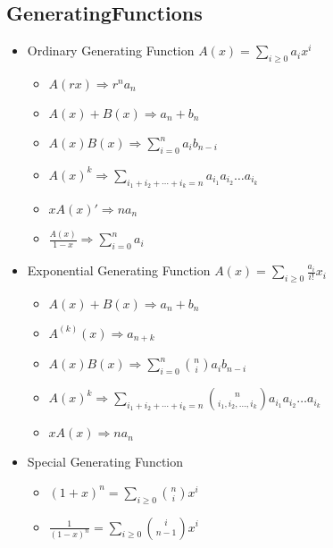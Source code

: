 \documentclass[10pt, a4paper, twocolumn, oneside]{article}
\begin{document}
\subsection{GeneratingFunctions}
\begin{itemize}
\item Ordinary Generating Function
$A(x) = \sum_{i\ge 0} a_ix^i$
\begin{itemize}
    \itemsep-0.5em
    \item $A(rx)             \Rightarrow r^na_n$
    \item $A(x) + B(x)       \Rightarrow a_n + b_n$
    \item $A(x)B(x)          \Rightarrow \sum_{i=0}^{n} a_ib_{n-i}$
    \item $A(x)^k            \Rightarrow \sum_{i_1+i_2+\cdots+i_k=n} a_{i_1}a_{i_2}\ldots a_{i_k}$
    \item $xA(x)'            \Rightarrow na_n$
    \item $\frac{A(x)}{1-x}  \Rightarrow \sum_{i=0}^{n} a_i$
\end{itemize}
\item Exponential Generating Function
$A(x) = \sum_{i\ge 0} \frac{a_i}{i!}x_i$
\begin{itemize}
    \itemsep-0.5em
    \item $A(x) + B(x)       \Rightarrow a_n + b_n$
    \item $A^{(k)}(x)        \Rightarrow a_{n+k}$
    \item $A(x)B(x)          \Rightarrow \sum_{i=0}^{n} \binom{n}{i}a_ib_{n-i}$
    \item $A(x)^k            \Rightarrow \sum_{i_1+i_2+\cdots+i_k=n} \binom{n}{i_1, i_2, \ldots, i_k}a_{i_1}a_{i_2}\ldots a_{i_k}$
    \item $xA(x)             \Rightarrow na_n$
\end{itemize}
\item Special Generating Function
\begin{itemize}
    \itemsep-0.5em
    \item $(1+x)^n           = \sum_{i\ge 0} \binom{n}{i}x^i$
    \item $\frac{1}{(1-x)^n} = \sum_{i\ge 0} \binom{i}{n-1}x^i$
\end{itemize}
\end{itemize}
\end{document}
